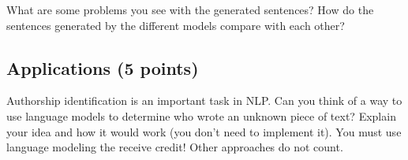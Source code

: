 \documentclass[12pt,a4paper]{article}
\begin{document}
\vspace{\baselineskip}

What are some problems you see with the generated sentences? How do the sentences generated by the different models compare with each other? 

\subsection{Applications (5 points)}

Authorship identification is an important task in NLP. Can you think of a way to use language models to determine who wrote an unknown piece of text? Explain your idea and how it would work (you don't need to implement it). You must use language modeling the receive credit! Other approaches do not count.
\end{document}
